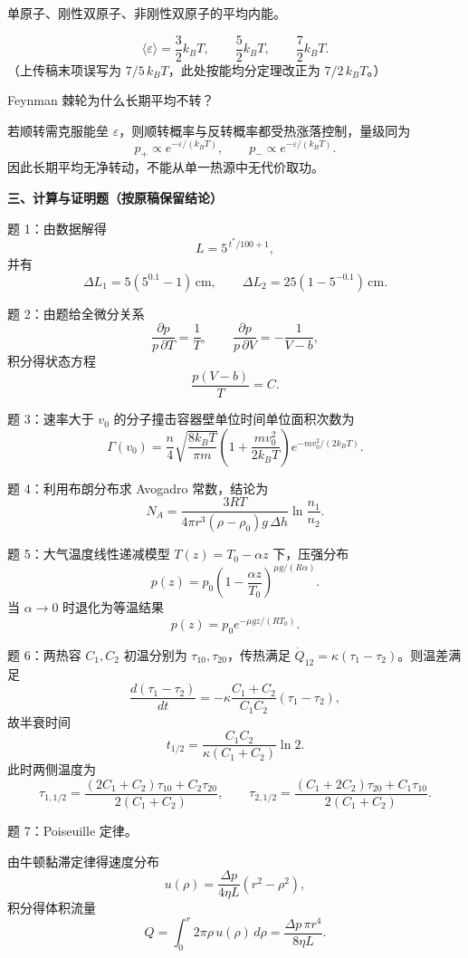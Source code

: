 \begin{question}
单原子、刚性双原子、非刚性双原子的平均内能。
\begin{solution}
\[
\langle \varepsilon\rangle=
\frac32k_BT,\qquad \frac52k_BT,\qquad \frac72k_BT.
\]
（上传稿末项误写为 $7/5\,k_BT$，此处按能均分定理改正为 $7/2\,k_BT$。）
\end{solution}
\end{question}

\begin{question}
Feynman 棘轮为什么长期平均不转？
\begin{solution}
若顺转需克服能垒 $\varepsilon$，则顺转概率与反转概率都受热涨落控制，量级同为
\[
p_+\propto e^{-\varepsilon/(k_BT)},
\qquad p_-\propto e^{-\varepsilon/(k_BT)}.
\]
因此长期平均无净转动，不能从单一热源中无代价取功。
\end{solution}
\end{question}

\textbf{三、计算与证明题（按原稿保留结论）}
\begin{question}
题 1：由数据解得
\[
L=5^{\,t^*/100+1},
\]
并有
\[
\Delta L_1=5(5^{0.1}-1)\,\mathrm{cm},
\qquad
\Delta L_2=25(1-5^{-0.1})\,\mathrm{cm}.
\]
\end{question}

\begin{question}
题 2：由题给全微分关系
\[
\frac{\partial p}{p\,\partial T}=\frac1T,
\qquad
\frac{\partial p}{p\,\partial V}=-\frac{1}{V-b},
\]
积分得状态方程
\[
\frac{p(V-b)}{T}=C.
\]
\end{question}

\begin{question}
题 3：速率大于 $v_0$ 的分子撞击容器壁单位时间单位面积次数为
\[
\Gamma(v_0)=\frac{n}{4}\sqrt{\frac{8k_BT}{\pi m}}
\left(1+\frac{mv_0^2}{2k_BT}\right)e^{-mv_0^2/(2k_BT)}.
\]
\end{question}

\begin{question}
题 4：利用布朗分布求 Avogadro 常数，结论为
\[
N_A=\frac{3RT}{4\pi r^3(\rho-\rho_0)g\,\Delta h}\ln\frac{n_1}{n_2}.
\]
\end{question}

\begin{question}
题 5：大气温度线性递减模型 $T(z)=T_0-\alpha z$ 下，压强分布
\[
p(z)=p_0\left(1-\frac{\alpha z}{T_0}\right)^{\mu g/(R\alpha)}.
\]
当 $\alpha\to 0$ 时退化为等温结果
\[
p(z)=p_0 e^{-\mu gz/(RT_0)}.
\]
\end{question}

\begin{question}
题 6：两热容 $C_1,C_2$ 初温分别为 $\tau_{10},\tau_{20}$，传热满足 $\dot Q_{12}=\kappa(\tau_1-\tau_2)$。则温差满足
\[
\frac{d(\tau_1-\tau_2)}{dt}
=-\kappa\frac{C_1+C_2}{C_1C_2}(\tau_1-\tau_2),
\]
故半衰时间
\[
t_{1/2}=\frac{C_1C_2}{\kappa(C_1+C_2)}\ln2.
\]
此时两侧温度为
\[
\tau_{1,1/2}=\frac{(2C_1+C_2)\tau_{10}+C_2\tau_{20}}{2(C_1+C_2)},
\qquad
\tau_{2,1/2}=\frac{(C_1+2C_2)\tau_{20}+C_1\tau_{10}}{2(C_1+C_2)}.
\]
\end{question}

\begin{question}
题 7：Poiseuille 定律。
\begin{solution}
由牛顿黏滞定律得速度分布
\[
u(\rho)=\frac{\Delta p}{4\eta L}(r^2-\rho^2),
\]
积分得体积流量
\[
Q=\int_0^r 2\pi\rho\,u(\rho)\,d\rho
=\frac{\Delta p\,\pi r^4}{8\eta L}.
\]
\end{solution}
\end{question}


